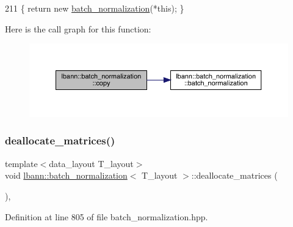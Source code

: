 \begin{DoxyCode}
211 \{ \textcolor{keywordflow}{return} \textcolor{keyword}{new} \hyperlink{classlbann_1_1batch__normalization_a04f092712566fd732e5fc5e48ee16f4d}{batch\_normalization}(*\textcolor{keyword}{this}); \}
\end{DoxyCode}
Here is the call graph for this function\+:\nopagebreak
\begin{figure}[H]
\begin{center}
\leavevmode
\includegraphics[width=350pt]{classlbann_1_1batch__normalization_af149d82996f351a5897a16a78ced113d_cgraph}
\end{center}
\end{figure}
\mbox{\label{classlbann_1_1batch__normalization_ac98f8fbb6e5ea998a06cef2c2cac9f03}} 
\subsubsection{\texorpdfstring{deallocate\+\_\+matrices()}{deallocate\_matrices()}}
{\footnotesize\ttfamily template$<$data\+\_\+layout T\+\_\+layout$>$ \\
void \hyperlink{classlbann_1_1batch__normalization}{lbann\+::batch\+\_\+normalization}$<$ T\+\_\+layout $>$\+::deallocate\+\_\+matrices (\begin{DoxyParamCaption}{ }\end{DoxyParamCaption})\hspace{0.3cm}{\ttfamily [inline]}, {\ttfamily [private]}}



Definition at line 805 of file batch\+\_\+normalization.\+hpp.


